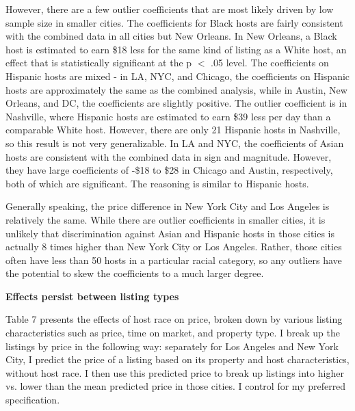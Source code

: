 \documentclass[11pt, oneside]{article}
\begin{document}
However, there are a few outlier coefficients that are most likely driven by low sample size in smaller cities. The coefficients for Black hosts are fairly consistent with the combined data in all cities but New Orleans. In New Orleans, a Black host is estimated to earn \$18 less for the same kind of listing as a White host, an effect that is statistically significant at the p $<$ .05 level. The coefficients on Hispanic hosts are mixed - in LA, NYC, and Chicago, the coefficients on Hispanic hosts are approximately the same as the combined analysis, while in Austin, New Orleans, and DC, the coefficients are slightly positive. The outlier coefficient is in Nashville, where Hispanic hosts are estimated to earn \$39 less per day than a comparable White host. However, there are only 21 Hispanic hosts in Nashville, so this result is not very generalizable. In LA and NYC, the coefficients of Asian hosts are consistent with the combined data in sign and magnitude. However, they have large coefficients of -\$18 to \$28 in Chicago and Austin, respectively, both of which are significant. The reasoning is similar to Hispanic hosts. 

Generally speaking, the price difference in New York City and Los Angeles is relatively the same. While there are outlier coefficients in smaller cities, it is unlikely that discrimination against Asian and Hispanic hosts in those cities is actually 8 times higher than New York City or Los Angeles. Rather, those cities often have less than 50 hosts in a particular racial category, so any outliers have the potential to skew the coefficients to a much larger degree.  

\textbf{Effects persist between listing types}

Table 7 presents the effects of host race on price, broken down by various listing characteristics such as price, time on market, and property type. I break up the listings by price in the following way: separately for Los Angeles and New York City, I predict the price of a listing based on its property and host characteristics, without host race. I then use this predicted price to break up listings into higher vs. lower than the mean predicted price in those cities. I control for my preferred specification.  
\end{document}
